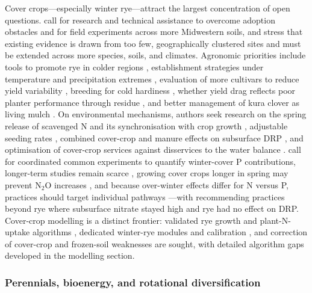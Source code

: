 Cover crops---especially winter rye---attract the largest concentration of open
questions. \textcite{Kladivko2014} call for research and technical assistance to
overcome adoption obstacles and for field experiments across more Midwestern
soils, and \textcite{Birru2023,Zhao2016} stress that existing evidence is drawn
from too few, geographically clustered sites and must be extended across more
species, soils, and climates. Agronomic priorities include tools to promote rye
in colder regions \parencite{Waring2020}, establishment strategies under
temperature and precipitation extremes \parencite{Bawa2023}, evaluation of more
cultivars to reduce yield variability \parencite{Kaspar2007}, breeding for cold
hardiness \parencite{Dinnes2002,Liu2019}, whether yield drag reflects poor
planter performance through residue \parencite{Dougherty2020}, and better
management of kura clover as living mulch \parencite{Qi2011b,Qi2011}. On
environmental mechanisms, authors seek research on the spring release of
scavenged N and its synchronisation with crop growth \parencite{Lacey2015},
adjustable seeding rates \parencite{Roth2018}, combined cover-crop and manure
effects on subsurface DRP \parencite{Askar2023}, and optimisation of cover-crop
services against disservices to the water balance \parencite{Meyer2019}.
\textcite{Liu2019} call for coordinated common experiments to quantify
winter-cover P contributions, longer-term studies remain scarce
\parencite{Kaspar2012,MartinezFeria2016}, growing cover crops longer in spring
may prevent N$_2$O increases \parencite{PrezaFontes2023}, and because over-winter
effects differ for N versus P, practices should target individual pathways
\parencite{McNeill2026}---with \textcite{Krueger2013} recommending practices
beyond rye where subsurface nitrate stayed high and rye had no effect on DRP.
Cover-crop modelling is a distinct frontier: validated rye growth and plant-N-
uptake algorithms \parencite{Feyereisen2006,Malone2007c}, dedicated winter-rye
modules and calibration \parencite{Malone2014b,Chatterjee2025}, and correction
of cover-crop and frozen-soil weaknesses \parencite{Dietzel2016,Gupta2022,Gupta2023b}
are sought, with detailed algorithm gaps developed in the modelling section.

\subsubsection{Perennials, bioenergy, and rotational diversification}

